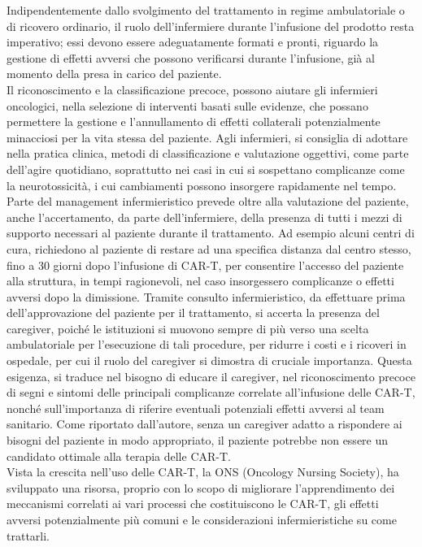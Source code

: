 Indipendentemente dallo svolgimento del trattamento in regime ambulatoriale o di ricovero ordinario, 
il ruolo dell’infermiere durante l’infusione del prodotto resta imperativo; essi devono essere adeguatamente 
formati e pronti, riguardo la gestione di  effetti avversi che possono verificarsi durante l’infusione, 
già al momento della presa in carico del paziente\cite{article2}.\\
Il riconoscimento e la classificazione precoce, possono aiutare gli infermieri oncologici, nella selezione di interventi 
basati sulle evidenze, che possano permettere la gestione e l’annullamento di effetti collaterali potenzialmente 
minacciosi per la vita stessa del paziente. Agli infermieri, si consiglia di adottare nella pratica clinica, 
metodi di classificazione e valutazione oggettivi, come parte dell’agire quotidiano, soprattutto nei 
casi in cui si sospettano complicanze come la neurotossicità, i cui cambiamenti possono insorgere 
rapidamente nel tempo\cite{article4}.\\

Parte del management infermieristico prevede oltre alla valutazione del paziente, anche l’accertamento, da parte 
dell’infermiere, della presenza di tutti i mezzi di supporto necessari al paziente durante il trattamento. 
Ad esempio alcuni centri di cura, richiedono al paziente di restare ad una specifica distanza dal centro stesso, 
fino a 30 giorni dopo l’infusione di CAR-T, per consentire l’accesso del paziente alla struttura, in tempi ragionevoli, 
nel caso insorgessero complicanze o effetti avversi dopo la dimissione. Tramite consulto infermieristico, da effettuare 
prima dell’approvazione del paziente per il trattamento, si accerta la presenza del caregiver, 
poiché le istituzioni si muovono sempre di più verso una scelta ambulatoriale per l’esecuzione di tali procedure, 
per ridurre i costi e i ricoveri in ospedale, per cui il ruolo del caregiver si dimostra di cruciale importanza\cite{article2}. 
Questa esigenza, si traduce nel bisogno di educare il caregiver, nel riconoscimento precoce di segni e sintomi delle 
principali complicanze correlate all’infusione delle CAR-T, nonché sull’importanza di riferire eventuali potenziali 
effetti avversi al team sanitario. Come riportato dall’autore, senza un caregiver adatto a rispondere ai 
bisogni del paziente in modo appropriato, il paziente potrebbe non essere un candidato ottimale 
alla terapia delle CAR-T\cite{article2}.\\

Vista la crescita nell’uso delle CAR-T, la ONS (Oncology Nursing Society), ha sviluppato una risorsa, 
proprio con lo scopo di migliorare l’apprendimento dei meccanismi correlati ai vari processi che costituiscono 
le CAR-T, gli effetti avversi potenzialmente più comuni e le considerazioni infermieristiche su come trattarli\cite{ONSCART}.

